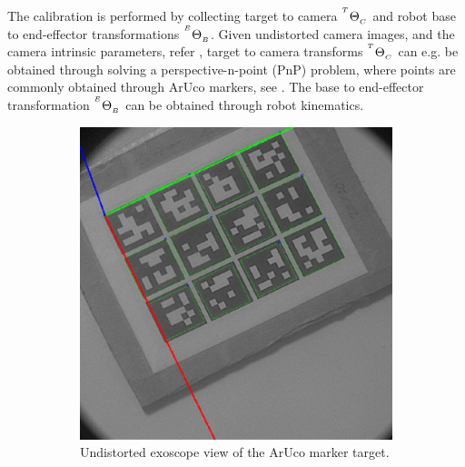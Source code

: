 The calibration is performed by collecting target to camera ${}^{^T}\Theta_{_C}$ and robot base to end-effector transformations ${}^{^E}\Theta_{_B}$. Given undistorted camera images, and the camera intrinsic parameters, refer , target to camera transforms ${}^{^T}\Theta_{_C}$ can e.g. be obtained through solving a perspective-n-point (PnP) problem, where points are commonly obtained through ArUco markers, see . The base to end-effector transformation ${}^{^E}\Theta_{_B}$ can be obtained through robot kinematics.
\begin{figure}
    \centering
    \begin{subfigure}[b]{0.49\textwidth}
        \centering
        \includegraphics[width=\textwidth]{introduction/img/aruco.png}
        \caption{Undistorted exoscope view of the ArUco marker target.}
    \end{subfigure}
    \begin{subfigure}[b]{0.49\textwidth}
        \centering

\end{subfigure}
\end{figure}
